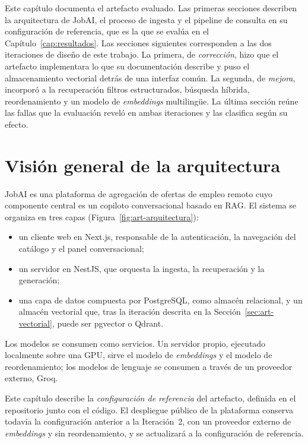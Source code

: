 Este capítulo documenta el artefacto evaluado. Las primeras secciones describen la arquitectura de JobAI, el proceso de ingesta y el pipeline de consulta en su configuración de referencia, que es la que se evalúa en el Capítulo~\ref{cap:resultados}. Las secciones siguientes corresponden a las dos iteraciones de diseño de este trabajo. La primera, de \emph{corrección}, hizo que el artefacto implementara lo que su documentación describe y puso el almacenamiento vectorial detrás de una interfaz común. La segunda, de \emph{mejora}, incorporó a la recuperación filtros estructurados, búsqueda híbrida, reordenamiento y un modelo de \textit{embeddings} multilingüe. La última sección reúne las fallas que la evaluación reveló en ambas iteraciones y las clasifica según su efecto.

\section{Visión general de la arquitectura}
\label{sec:art-arquitectura}

JobAI es una plataforma de agregación de ofertas de empleo remoto cuyo componente central es un copiloto conversacional basado en RAG. El sistema se organiza en tres capas (Figura~\ref{fig:art-arquitectura}):
\begin{itemize}
    \item un cliente web en Next.js, responsable de la autenticación, la navegación del catálogo y el panel conversacional;
    \item un servidor en NestJS, que orquesta la ingesta, la recuperación y la generación;
    \item una capa de datos compuesta por PostgreSQL, como almacén relacional, y un almacén vectorial que, tras la iteración descrita en la Sección~\ref{sec:art-vectorial}, puede ser pgvector o Qdrant.
\end{itemize}
Los modelos se consumen como servicios. Un servidor propio, ejecutado localmente sobre una GPU, sirve el modelo de \textit{embeddings} y el modelo de reordenamiento; los modelos de lenguaje se consumen a través de un proveedor externo, Groq.

Este capítulo describe la \emph{configuración de referencia} del artefacto, definida en el repositorio junto con el código. El despliegue público de la plataforma conserva todavía la configuración anterior a la Iteración~2, con un proveedor externo de \textit{embeddings} y sin reordenamiento, y se actualizará a la configuración de referencia.

